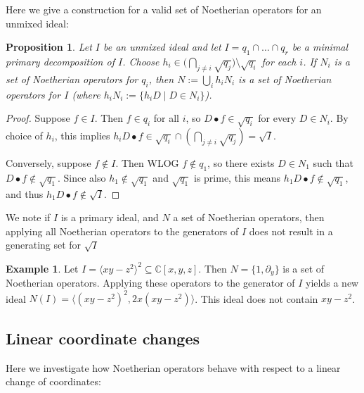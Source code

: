\documentclass[letterpaper]{article}
\theoremstyle{plain}
\newtheorem{proposition}[theorem]{Proposition}
\theoremstyle{definition}
\newtheorem{example}[theorem]{Example}
\theoremstyle{remark}
\begin{document}
Here we give a construction for a valid set of Noetherian operators for an unmixed ideal:
\begin{proposition}
Let $I$ be an unmixed ideal and let $I = q_1 \cap \ldots \cap q_r$ be a minimal primary decomposition of $I$. Choose $\displaystyle h_i \in \Big( \bigcap_{j \ne i} \sqrt{q_j} \Big) \setminus \sqrt{q_i}$ for each $i$. If $N_i$ is a set of Noetherian operators for $q_i$, then $N := \bigcup_i h_iN_i$ is a set of Noetherian operators for $I$ (where $h_i N_i := \{ h_i D \mid D \in N_i \}$).
\end{proposition}

\begin{proof}
Suppose $f \in I$. Then $f \in q_i$ for all $i$, so $D \bullet f \in \sqrt{q_i}$ for every $D \in N_i$. By choice of $h_i$, this implies $h_i D \bullet f \in \sqrt{q_i} \cap \left( \bigcap_{j \ne i} \sqrt{q_j} \right) = \sqrt{I}$.

Conversely, suppose $f \not \in I$. Then WLOG $f \not \in q_1$, so there exists $D \in N_1$ such that $D \bullet f \not \in \sqrt{q_1}$. Since also $h_1 \not \in \sqrt{q_1}$ and $\sqrt{q_1}$ is prime, this means $h_1 D \bullet f \not \in \sqrt{q_1}$, and thus $h_1 D \bullet f \not \in \sqrt{I}$.
\end{proof}

We note if $I$ is a primary ideal, and $N$ a set of Noetherian operators, then applying all Noetherian operators to the generators of $I$ does not result in a generating set for $\sqrt{I}$
\begin{example}
	Let $I = \langle xy - z^2 \rangle^2 \subseteq \mathbb{C}[x,y,z]$. Then $N = \{1, \partial_y\}$ is a set of Noetherian operators. Applying these operators to the generator of $I$ yields a new ideal $N(I) = \langle (xy-z^2)^2, 2x(xy-z^2) \rangle$. This ideal does not contain $xy - z^2$.
\end{example}

\subsection{Linear coordinate changes}

Here we investigate how Noetherian operators behave with respect to a linear change of coordinates:
\end{document}
